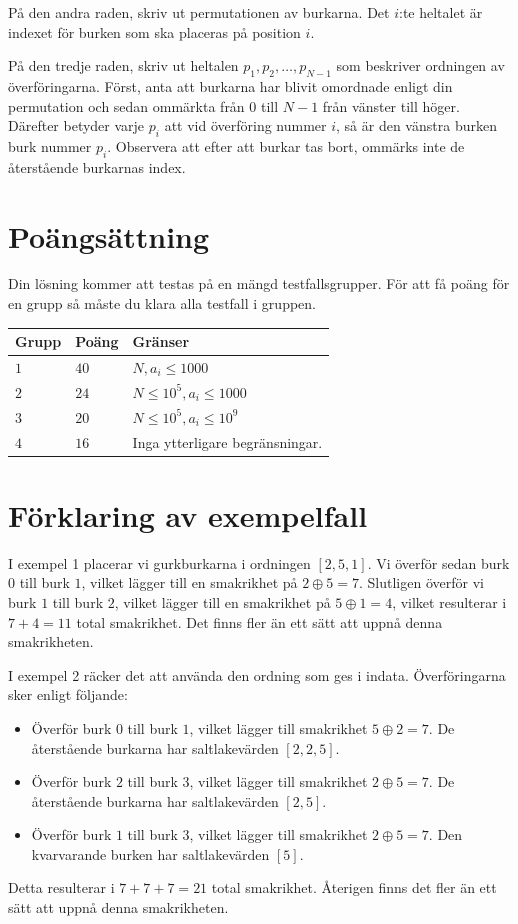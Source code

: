 På den andra raden, skriv ut permutationen av burkarna. Det $i$:te heltalet är indexet för burken som ska placeras
på position $i$.

På den tredje raden, skriv ut heltalen $p_1, p_2, \dots, p_{N-1}$ som beskriver ordningen av överföringarna. Först,
anta att burkarna har blivit omordnade enligt din permutation och sedan ommärkta från $0$ till $N-1$ från vänster
till höger. Därefter betyder varje $p_i$ att vid överföring nummer $i$, så är den vänstra burken burk nummer $p_i$.
Observera att efter att burkar tas bort, ommärks inte de återstående burkarnas index.

\section*{Poängsättning}
Din lösning kommer att testas på en mängd testfallsgrupper.
För att få poäng för en grupp så måste du klara alla testfall i gruppen.

\noindent
\begin{tabular}{| l | l | p{12cm} |}
  \hline
  \textbf{Grupp} & \textbf{Poäng} & \textbf{Gränser} \\ \hline
  $1$    & $40$        & $N, a_i \leq 1000$ \\ \hline
  $2$    & $24$        & $N \leq 10^5, a_i \leq 1000$ \\ \hline
  $3$    & $20$        & $N \leq 10^5, a_i \leq 10^9$ \\ \hline
  $4$    & $16$        & Inga ytterligare begränsningar. \\ \hline  
\end{tabular}

\section*{Förklaring av exempelfall}
I exempel 1 placerar vi gurkburkarna i ordningen $[2,5,1]$. Vi överför sedan burk $0$ till burk $1$, vilket
lägger till en smakrikhet på $2 \oplus 5=7$. Slutligen överför vi burk $1$ till burk $2$, vilket lägger till en
smakrikhet på $5 \oplus 1=4$, vilket resulterar i $7+4=11$ total smakrikhet. Det finns fler än ett sätt att uppnå
denna smakrikheten.

I exempel 2 räcker det att använda den ordning som ges i indata. Överföringarna sker enligt följande:
\begin{itemize}
    \item Överför burk $0$ till burk $1$, vilket lägger till smakrikhet $5 \oplus 2=7$. De återstående burkarna har saltlakevärden $[2,2,5]$.
    \item Överför burk $2$ till burk $3$, vilket lägger till smakrikhet $2 \oplus 5=7$. De återstående burkarna har saltlakevärden $[2,5]$.
    \item Överför burk $1$ till burk $3$, vilket lägger till smakrikhet $2 \oplus 5=7$. Den kvarvarande burken har saltlakevärden $[5]$.
\end{itemize}
Detta resulterar i $7+7+7=21$ total smakrikhet. Återigen finns det fler än ett sätt att uppnå denna smakrikheten.

